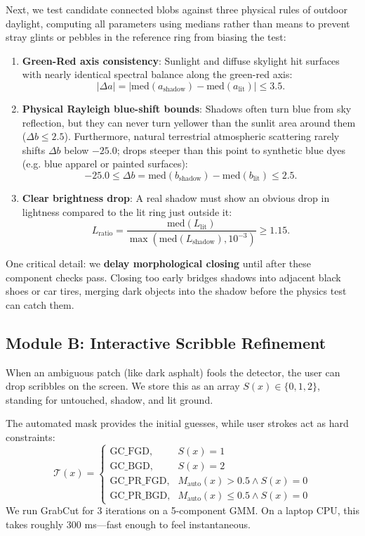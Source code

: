 \documentclass[10pt,twocolumn,letterpaper]{article}
\begin{document}
Next, we test candidate connected blobs against three physical rules of outdoor daylight, computing all parameters using medians rather than means to prevent stray glints or pebbles in the reference ring from biasing the test:
\begin{enumerate}
    \item \textbf{Green-Red axis consistency}: Sunlight and diffuse skylight hit surfaces with nearly identical spectral balance along the green-red axis:
    \begin{equation}
    |\Delta a| = |\text{med}(a_{\text{shadow}}) - \text{med}(a_{\text{lit}})| \le 3.5.
    \end{equation}
    \item \textbf{Physical Rayleigh blue-shift bounds}: Shadows often turn blue from sky reflection, but they can never turn yellower than the sunlit area around them ($\Delta b \le 2.5$). Furthermore, natural terrestrial atmospheric scattering rarely shifts $\Delta b$ below $-25.0$; drops steeper than this point to synthetic blue dyes (e.g. blue apparel or painted surfaces):
    \begin{equation}
    -25.0 \le \Delta b = \text{med}(b_{\text{shadow}}) - \text{med}(b_{\text{lit}}) \le 2.5.
    \end{equation}
    \item \textbf{Clear brightness drop}: A real shadow must show an obvious drop in lightness compared to the lit ring just outside it:
    \begin{equation}
    L_{\text{ratio}} = \frac{\text{med}(L_{\text{lit}})}{\max(\text{med}(L_{\text{shadow}}), 10^{-3})} \ge 1.15.
    \end{equation}
\end{enumerate}
One critical detail: we \textbf{delay morphological closing} until after these component checks pass. Closing too early bridges shadows into adjacent black shoes or car tires, merging dark objects into the shadow before the physics test can catch them.

\subsection{Module B: Interactive Scribble Refinement}
When an ambiguous patch (like dark asphalt) fools the detector, the user can drop scribbles on the screen. We store this as an array $S(x) \in \{0, 1, 2\}$, standing for untouched, shadow, and lit ground.

The automated mask provides the initial guesses, while user strokes act as hard constraints:
\begin{equation}
\mathcal{T}(x) = 
\begin{cases}
\text{GC\_FGD}, & S(x) = 1 \\
\text{GC\_BGD}, & S(x) = 2 \\
\text{GC\_PR\_FGD}, & M_{\text{auto}}(x) > 0.5 \land S(x) = 0 \\
\text{GC\_PR\_BGD}, & M_{\text{auto}}(x) \le 0.5 \land S(x) = 0
\end{cases}
\end{equation}
We run GrabCut for 3 iterations on a 5-component GMM. On a laptop CPU, this takes roughly 300 ms—fast enough to feel instantaneous.
\end{document}
